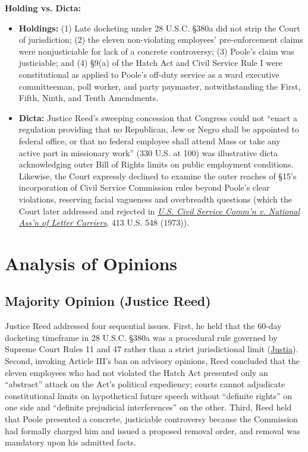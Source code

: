 \documentclass[12pt]{article}
\begin{document}
\textbf{Holding vs. Dicta:}
\begin{itemize}
\item \textbf{Holdings:} (1) Late docketing under 28 U.S.C. \S 380a did not strip the Court of jurisdiction; (2) the eleven non-violating employees' pre-enforcement claims were nonjusticiable for lack of a concrete controversy; (3) Poole's claim was justiciable; and (4) \S 9(a) of the Hatch Act and Civil Service Rule I were constitutional as applied to Poole's off-duty service as a ward executive committeeman, poll worker, and party paymaster, notwithstanding the First, Fifth, Ninth, and Tenth Amendments.
\item \textbf{Dicta:} Justice Reed's sweeping concession that Congress could not ``enact a regulation providing that no Republican, Jew or Negro shall be appointed to federal office, or that no federal employee shall attend Mass or take any active part in missionary work'' (330 U.S. at 100) was illustrative dicta acknowledging outer Bill of Rights limits on public employment conditions. Likewise, the Court expressly declined to examine the outer reaches of \S 15's incorporation of Civil Service Commission rules beyond Poole's clear violations, reserving facial vagueness and overbreadth questions (which the Court later addressed and rejected in \href{https://www.law.cornell.edu/supremecourt/text/413/548}{\textit{U.S. Civil Service Comm'n v. National Ass'n of Letter Carriers}}, 413 U.S. 548 (1973)).
\end{itemize}

\section{Analysis of Opinions}

\subsection{Majority Opinion (Justice Reed)}

Justice Reed addressed four sequential issues. First, he held that the 60-day docketing timeframe in 28 U.S.C. \S 380a was a procedural rule governed by Supreme Court Rules 11 and 47 rather than a strict jurisdictional limit (\href{https://supreme.justia.com/cases/federal/us/330/75/}{Justia}). Second, invoking Article III's ban on advisory opinions, Reed concluded that the eleven employees who had not violated the Hatch Act presented only an ``abstract'' attack on the Act's political expediency; courts cannot adjudicate constitutional limits on hypothetical future speech without ``definite rights'' on one side and ``definite prejudicial interferences'' on the other. Third, Reed held that Poole presented a concrete, justiciable controversy because the Commission had formally charged him and issued a proposed removal order, and removal was mandatory upon his admitted facts.
\end{document}
